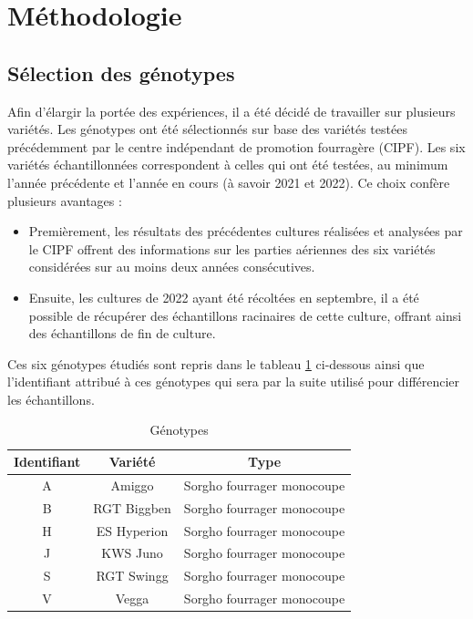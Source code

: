 \section{Méthodologie}

\subsection{Sélection des génotypes}
Afin d'élargir la portée des expériences, il a été décidé de travailler sur plusieurs variétés.
Les génotypes ont été sélectionnés sur base des variétés testées précédemment par le centre indépendant de promotion fourragère (CIPF).
Les six variétés échantillonnées correspondent à celles qui ont été testées, au minimum l'année précédente et l'année en cours (à savoir 2021 et 2022).
Ce choix confère plusieurs avantages :
\begin{itemize}
    \item Premièrement, les résultats des précédentes cultures réalisées et analysées par le CIPF offrent des informations sur les parties aériennes des six variétés considérées sur au moins deux années consécutives.
    \item Ensuite, les cultures de 2022 ayant été récoltées en septembre, il a été possible de récupérer des échantillons racinaires de cette culture, offrant ainsi des échantillons de fin de culture.
\end{itemize}
Ces six génotypes étudiés sont repris dans le tableau \ref{tab:variete} ci-dessous ainsi que l'identifiant attribué à ces génotypes qui sera par la suite utilisé pour différencier les échantillons.

\begin{table}[ht]
    \centering
    \caption{Génotypes}
    \begin{tabular}{c c c}
        \hline
        \textbf{Identifiant} & \textbf{Variété} & \textbf{Type} \\
        \hline
        \hline
        A & Amiggo & Sorgho fourrager monocoupe \\
        B & RGT Biggben & Sorgho fourrager monocoupe \\
        H & ES Hyperion & Sorgho fourrager monocoupe \\
        J & KWS Juno & Sorgho fourrager monocoupe \\
        S & RGT Swingg & Sorgho fourrager monocoupe \\
        V & Vegga & Sorgho fourrager monocoupe
    \end{tabular}
    \label{tab:variete}
\end{table}

